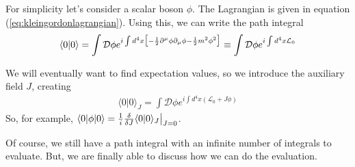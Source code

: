 \documentclass[12pt,epsf]{article}
\def\nolabel{\nonumber }
\def\nolabel{\nonumber }
\begin{document}
For simplicity let's consider a scalar boson $\phi$.  The Lagrangian is
given in equation (\ref{eq:kleingordonlagrangian}).  Using this, we can
write the path integral 
\begin{eqnarray}
\langle 0 | 0 \rangle = \int \mathcal{D} \phi e^{i\int d^4x
\big[-{1\over 2} \partial^{\mu}\phi \partial_{\mu} \phi - {1\over 2}
m^2\phi^2 \big]} \equiv \int \mathcal{D}\phi e^{i\int d^4x
\mathcal{L}_0}\nolabel
\end{eqnarray}

We will eventually want to find expectation values, so we introduce the
auxiliary field $J$, creating
\begin{eqnarray}
\langle 0 | 0 \rangle_J = \int \mathcal{D}\phi e^{i\int d^4x
(\mathcal{L}_0 + J \phi)} \label{eq:vev1}
\end{eqnarray}
So, for example, $\langle 0 | \phi | 0 \rangle = {1\over i} {\delta
\over \delta J} \langle 0 | 0 \rangle_J \big|_{J=0}$.  

Of course, we still have a path integral with an infinite number of
integrals to evaluate.	But, we are finally able to discuss how we can
do the evaluation.  
\end{document}
